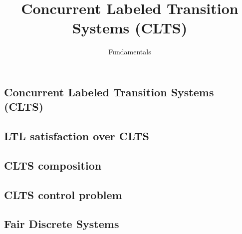 \documentclass{article}
\title{Concurrent Labeled Transition Systems (CLTS)} %
\author{Fundamentals} %
\date{}
\begin{document}
\maketitle

\setcounter{section}{1} %
\setcounter{theorem}{1} %

\subsection{Concurrent Labeled Transition Systems (CLTS)}


\subsection{LTL satisfaction over CLTS}


%

%

\subsection{CLTS composition}


\subsection{CLTS control problem}


%

\subsection{Fair Discrete Systems}

\end{document}
